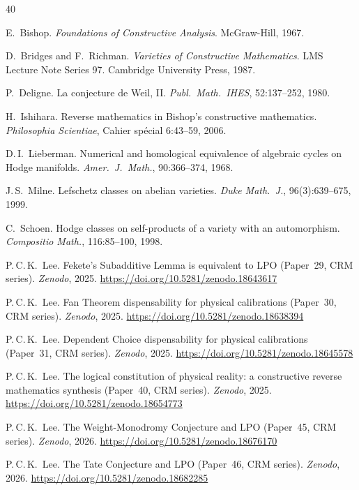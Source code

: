 \documentclass[11pt]{article}
\theoremstyle{plain}
\theoremstyle{definition}
\theoremstyle{remark}
\begin{document}
\begin{thebibliography}{40}

E.~Bishop.
\textit{Foundations of Constructive Analysis}.
McGraw-Hill, 1967.

D.~Bridges and F.~Richman.
\textit{Varieties of Constructive Mathematics}.
LMS Lecture Note Series 97. Cambridge University Press, 1987.

P.~Deligne.
La conjecture de Weil, II.
\textit{Publ.\ Math.\ IHES}, 52:137--252, 1980.

H.~Ishihara.
Reverse mathematics in Bishop's constructive mathematics.
\textit{Philosophia Scientiae}, Cahier sp\'ecial 6:43--59, 2006.

D.\,I.~Lieberman.
Numerical and homological equivalence of algebraic cycles
on Hodge manifolds.
\textit{Amer.\ J.\ Math.}, 90:366--374, 1968.

J.\,S.~Milne.
Lefschetz classes on abelian varieties.
\textit{Duke Math.\ J.}, 96(3):639--675, 1999.

C.~Schoen.
Hodge classes on self-products of a variety with an automorphism.
\textit{Compositio Math.}, 116:85--100, 1998.

P.\,C.\,K.~Lee.
Fekete's Subadditive Lemma is equivalent to LPO
(Paper~29, CRM series).
\textit{Zenodo}, 2025.
\url{https://doi.org/10.5281/zenodo.18643617}

P.\,C.\,K.~Lee.
Fan Theorem dispensability for physical calibrations
(Paper~30, CRM series).
\textit{Zenodo}, 2025.
\url{https://doi.org/10.5281/zenodo.18638394}

P.\,C.\,K.~Lee.
Dependent Choice dispensability for physical calibrations
(Paper~31, CRM series).
\textit{Zenodo}, 2025.
\url{https://doi.org/10.5281/zenodo.18645578}

P.\,C.\,K.~Lee.
The logical constitution of physical reality:
a constructive reverse mathematics synthesis
(Paper~40, CRM series).
\textit{Zenodo}, 2025.
\url{https://doi.org/10.5281/zenodo.18654773}

P.\,C.\,K.~Lee.
The Weight-Monodromy Conjecture and LPO
(Paper~45, CRM series).
\textit{Zenodo}, 2026.
\url{https://doi.org/10.5281/zenodo.18676170}

P.\,C.\,K.~Lee.
The Tate Conjecture and LPO
(Paper~46, CRM series).
\textit{Zenodo}, 2026.
\url{https://doi.org/10.5281/zenodo.18682285}


\end{thebibliography}
\end{document}
